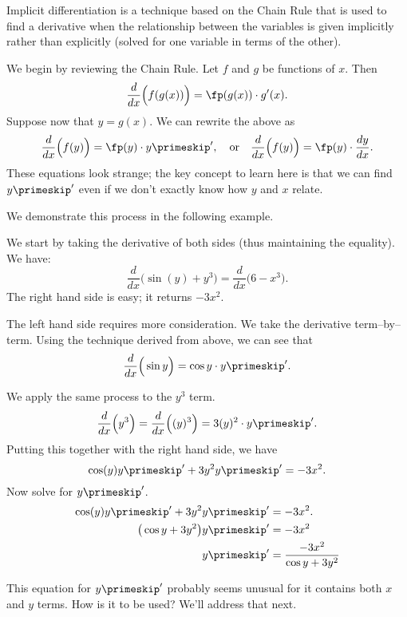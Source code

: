 Implicit differentiation is a technique based on the Chain Rule that is used to find a derivative when the relationship between the variables is given implicitly rather than explicitly (solved for one variable in terms of the other).\bigskip

We begin by reviewing the Chain Rule. Let $f$ and $g$ be functions of $x$. Then \[\frac{d}{dx}\Big(f(g(x))\Big) = \fp(g(x))\cdot g'(x).\]
Suppose now that $y=g(x)$. We can rewrite the above as
\begin{equation}
\frac{d}{dx}\Big(f(y)\Big) = \fp(y)\cdot y\primeskip', \quad \text{or}\quad
\frac{d}{dx}\Big(f(y)\Big) = \fp(y)\cdot \frac{dy}{dx} .\label{eq:implicit1}
\end{equation}
These equations look strange; the key concept to learn here is that we can find $y\primeskip'$ even if we don't exactly know how $y$ and $x$ relate.\\


We demonstrate this process in the following example.

{We start by taking the derivative of both sides (thus maintaining the equality). We have:
\[\frac{d}{dx}\Big(\sin(y) + y^3\Big)=\frac{d}{dx}\Big(6-x^3\Big).\]
The right hand side is easy; it returns $-3x^2$. 

The left hand side requires more consideration. We take the derivative term--by--term.  Using the technique derived from  above, we can see that
\[\frac{d}{dx}\Big(\sin y\Big) = \cos y \cdot y\primeskip'.\] %

We apply the same process to the $y^3$ term. 
\[
\frac{d}{dx}\Big(y^3\Big) = \frac{d}{dx}\Big((y)^3\Big) = 3(y)^2\cdot y\primeskip'.
\]
Putting this together with the right hand side, we have
\[\cos(y)y\primeskip'+3y^2y\primeskip' = -3x^2.\]
Now solve for $y\primeskip'$.
\begin{align*}
	\cos(y)y\primeskip'+3y^2y\primeskip' 	&= -3x^2.\\
	\big(\cos y+3y^2\big)y\primeskip' &=	-3x^2\\
	y\primeskip'&=	\frac{-3x^2}{\cos y+3y^2}
\end{align*}

This equation for $y\primeskip'$ probably seems unusual for it contains both $x$ and $y$ terms. How is it to be used? We'll address that next.}

